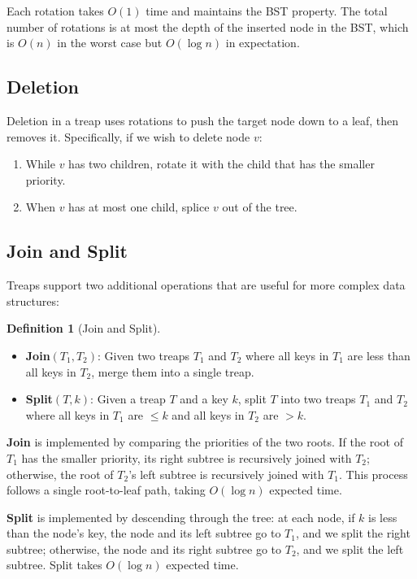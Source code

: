 \documentclass[twoside,12pt]{book}
\theoremstyle{plain}
\theoremstyle{definition}
\newtheorem{definition}[theorem]{Definition}
\theoremstyle{remark}
\begin{document}
Each rotation takes $O(1)$ time and maintains the BST property. The total number of rotations is at most the depth of the inserted node in the BST, which is $O(n)$ in the worst case but $O(\log n)$ in expectation.

\subsection{Deletion}

Deletion in a treap uses rotations to push the target node down to a leaf, then removes it. Specifically, if we wish to delete node $v$:
\begin{enumerate}[nosep]
    \item While $v$ has two children, rotate it with the child that has the smaller priority.
    \item When $v$ has at most one child, splice $v$ out of the tree.
\end{enumerate}

\subsection{Join and Split}

Treaps support two additional operations that are useful for more complex data structures:

\begin{definition}[Join and Split]
\begin{itemize}[nosep]
    \item \textbf{Join}$(T_1, T_2)$: Given two treaps $T_1$ and $T_2$ where all keys in $T_1$ are less than all keys in $T_2$, merge them into a single treap.
    \item \textbf{Split}$(T, k)$: Given a treap $T$ and a key $k$, split $T$ into two treaps $T_1$ and $T_2$ where all keys in $T_1$ are $\leq k$ and all keys in $T_2$ are $> k$.
\end{itemize}
\end{definition}

\textbf{Join} is implemented by comparing the priorities of the two roots. If the root of $T_1$ has the smaller priority, its right subtree is recursively joined with $T_2$; otherwise, the root of $T_2$'s left subtree is recursively joined with $T_1$. This process follows a single root-to-leaf path, taking $O(\log n)$ expected time.

\textbf{Split} is implemented by descending through the tree: at each node, if $k$ is less than the node's key, the node and its left subtree go to $T_1$, and we split the right subtree; otherwise, the node and its right subtree go to $T_2$, and we split the left subtree. Split takes $O(\log n)$ expected time.
\end{document}
